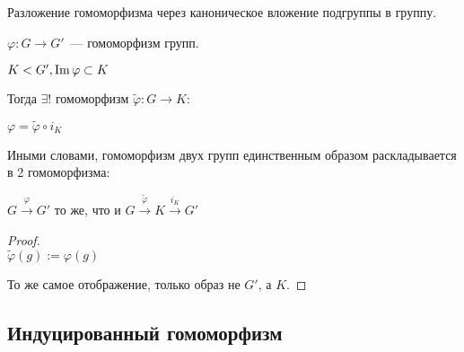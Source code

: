 \begin{theorem-non}
    Разложение гомоморфизма через каноническое вложение подгруппы в группу. 

    $\varphi: G \to G'$~--- гомоморфизм групп.

    $K < G', \operatorname{Im} \varphi \subset K$

    Тогда $\exists !$ гомоморфизм $\tilde{\varphi}: G \to K:$

    $\varphi = \tilde{\varphi} \circ i_K$

    Иными словами, гомоморфизм двух групп единственным образом раскладывается в 2 гомоморфизма:

    $G \stackrel{\varphi}{\to} G'$ то же, что и $G \stackrel{\tilde{\varphi}}{\to} K \stackrel{i_{K}}{\to} G'$

    \begin{proof}
        $ $ \\
        $\tilde{\varphi}(g) := \varphi(g)$
        
        То же самое отображение, только образ не $G'$, а $K$.
        
    \end{proof}
\end{theorem-non}

\subsection{Индуцированный гомоморфизм}

